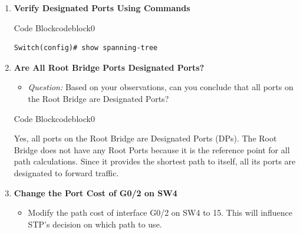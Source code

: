 \documentclass[a4paper]{book}
\begin{document}
\begin{enumerate}
	\item \textbf{Verify Designated Ports Using Commands}


	      \begin{ocg}{Code Block}{codeblock}{0}
		      \vspace{0.5cm}
		      \begin{lstlisting}
Switch(config)# show spanning-tree
\end{lstlisting}

	      \end{ocg}

	\item \textbf{Are All Root Bridge Ports Designated Ports?}
	      \begin{itemize}
		      \item \textit{Question:} Based on your observations, can you conclude that all ports on the Root Bridge are Designated Ports?
	      \end{itemize}


	      \begin{ocg}{Code Block}{codeblock}{0}
		      \vspace{0.5cm}
		      \begin{tcolorbox}
			      \small{
				      Yes, all ports on the Root Bridge are Designated Ports (DPs). The Root Bridge does not have any Root Ports because it is the reference point for all path calculations. Since it provides the shortest path to itself, all its ports are designated to forward traffic.
			      }
		      \end{tcolorbox}
	      \end{ocg}

	\item \textbf{Change the Port Cost of G0/2 on SW4}
	      \begin{itemize}
		      \item Modify the path cost of interface G0/2 on SW4 to 15. This will influence STP’s decision on which path to use.
	      \end{itemize}



\end{enumerate}
\end{document}
